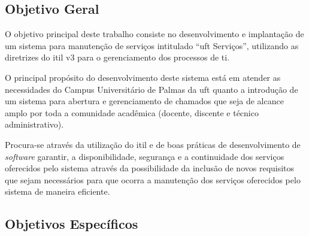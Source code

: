 \subsection{Objetivo Geral}

\noindent O objetivo principal deste trabalho consiste no desenvolvimento e implantação de um sistema para manutenção de serviços intitulado ``\acrshort{uft} Serviços'', utilizando as diretrizes do \gls{itil} v3 para o gerenciamento dos processos de \acrshort{ti}. 

O principal propósito do desenvolvimento deste sistema está em atender as necessidades do Campus Universitário de Palmas da \acrshort{uft} quanto a introdução de um sistema para abertura e gerenciamento de chamados que seja de alcance amplo por toda a comunidade acadêmica (docente, discente e técnico administrativo). 

Procura-se através da utilização do \acrshort{itil} e de boas práticas de desenvolvimento de \textit{software} garantir, a disponibilidade, segurança e a continuidade dos serviços oferecidos pelo sistema através da possibilidade da inclusão de novos requisitos que sejam necessários para que ocorra a manutenção dos serviços oferecidos pelo sistema de maneira eficiente.

\subsection{Objetivos Específicos}

